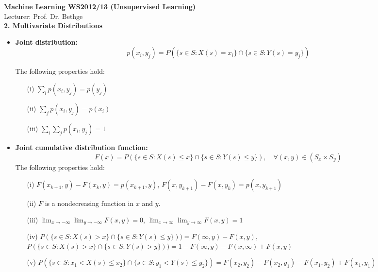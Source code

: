 \begin{center}
{\LARGE\bf  
Machine Learning WS2012/13 (Unsupervised Learning)}\\[.5cm]
{\Large Lecturer: Prof. Dr. Bethge\\[1cm]

\bf 2. Multivariate Distributions
}
\end{center}


\begin{itemize}

\item {\bf Joint distribution:} 
$$
p(x_i, y_j) = P(\{s \in S: X(s) = x_i\} \cap \{s \in S: Y(s) = y_j\})
$$

The following properties hold:
\begin{itemize}
\item[(i)] $\sum_i p(x_i, y_j) = p(y_j)$
\item[(ii)]  $\sum_j p(x_i, y_j) = p(x_i)$
\item[(iii)]  $\sum_i \sum_j p(x_i, y_j) = 1$\\
\end{itemize}

\item {\bf Joint cumulative distribution function:} 
$$
F(x) = P(\{s \in S: X(s) \le x\} \cap \{s \in S: Y(s) \le y\}), \quad \forall (x,y) \in (S_x \times S_y)
$$
The following properties hold:
\begin{itemize}
\item[(i)] $F(x_{k+1},y) - F(x_k,y) = p(x_{k+1},y)$,   \quad $F(x,y_{k+1}) - F(x,y_k) = p(x,y_{k+1})$
\item[(ii)] $F$ is a nondecreasing function in $x$ and $y$.
\item[(iii)] $\lim_{x\to -\infty} \lim_{y\to -\infty}  F(x,y)= 0$, \quad $\lim_{x\to \infty} \lim_{y\to \infty}  F(x,y)= 1$
\item[(iv)] $ P(\{s \in S: X(s) > x\} \cap \{s \in S: Y(s) \le y\})) = F(\infty,y)-F(x,y)$, \\ $ P(\{s \in S: X(s) > x\} \cap \{s \in S: Y(s) > y\})) = 1-F(\infty,y)-F(x,\infty)+F(x,y)$
\item[(v)] $ P(\{s \in S: x_1 < X(s) \le x_2\} \cap \{s \in S: y_1 < Y(s) \le y_2\}) = F(x_2,y_2) - F(x_2,y_1)-F(x_1,y_2) + F(x_1,y_1)$
\end{itemize}


\end{itemize}
